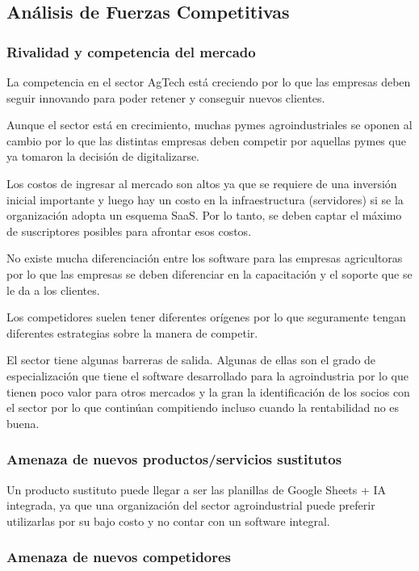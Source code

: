 \documentclass[man,12pt]{apa7}
\begin{document}
\subsection{Análisis de Fuerzas Competitivas}

\subsubsection{Rivalidad y competencia del mercado}

La competencia en el sector AgTech está creciendo por lo que las empresas deben seguir innovando para poder retener y conseguir nuevos clientes.

Aunque el sector está en crecimiento, muchas pymes agroindustriales se oponen al cambio por lo que las distintas empresas deben competir por aquellas pymes que ya tomaron la decisión de digitalizarse.

Los costos de ingresar al mercado son altos ya que se requiere de una inversión inicial importante y luego hay un costo en la infraestructura (servidores) si se la organización adopta un esquema SaaS. Por lo tanto, se deben captar el máximo de suscriptores posibles para afrontar esos costos.

No existe mucha diferenciación entre los software para las empresas agricultoras por lo que las empresas se deben diferenciar en la capacitación y el soporte que se le da a los clientes.

Los competidores suelen tener diferentes orígenes por lo que seguramente tengan diferentes estrategias sobre la manera de competir.

El sector tiene algunas barreras de salida. Algunas de ellas son el grado de especialización que tiene el software desarrollado para la agroindustria por lo que tienen poco valor para otros mercados y la gran la identificación de los socios con el sector por lo que continúan compitiendo incluso cuando la rentabilidad no es buena.

\subsubsection{Amenaza de nuevos productos/servicios sustitutos}

Un producto sustituto puede llegar a ser las planillas de Google Sheets + IA integrada, ya que una organización del sector agroindustrial puede preferir utilizarlas por su bajo costo y no contar con un software integral.

\subsubsection{Amenaza de nuevos competidores}
\end{document}
